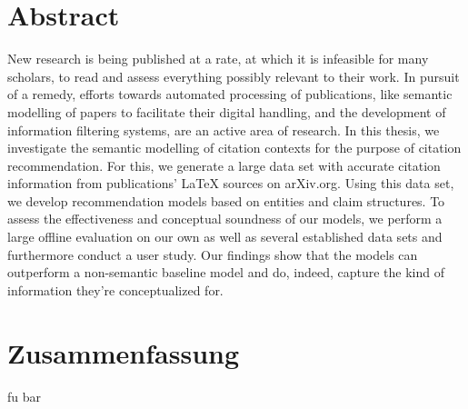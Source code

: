 \chapter*{Abstract}
New research is being published at a rate, at which it is %
infeasible for many scholars, to read and assess everything possibly %
relevant to their work. %
In pursuit of a remedy, efforts towards automated processing of publications, like semantic modelling of papers to facilitate their digital handling, and the development of information filtering systems, are an active area of research. %
In this thesis, we investigate the semantic modelling of citation contexts for the purpose of citation recommendation. For this, we generate a large data set with accurate citation information from publications' \LaTeX{} sources on arXiv.org. Using this data set, we develop recommendation models based on entities and claim structures. To assess the effectiveness and conceptual soundness of our models, we perform a large offline evaluation on our own as well as several established data sets and furthermore conduct a user study. Our findings show that the models can outperform a non-semantic baseline model and do, indeed, capture the kind of information they're conceptualized for.


\chapter*{Zusammenfassung}
fu bar
